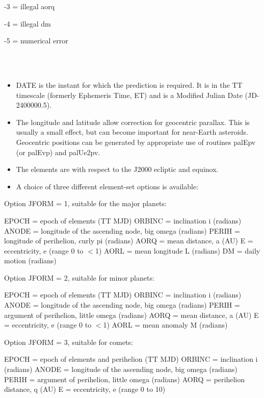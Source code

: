 \documentclass[twoside,11pt]{article}
\renewcommand{\_}{\texttt{\symbol{95}}}
\newcommand{\sstnotes}[1]{\goodbreak \item[Notes:] \mbox{} \\[1.3ex] #1}
\newcommand{\sstitemlist}[1]{
  \mbox{} \\
  \vspace{-3.5ex}
  \begin{itemize}
     #1
  \end{itemize}
}
\newcommand{\sstitem}{\item}
\newcommand{\sstnotes}[1]{\item[Notes:] #1 }
\newcommand{\sstitemlist}[1]{
      \begin{itemize}
         #1
      \end{itemize}
      \\
   }
\newcommand{\sstitem}{\item}
\begin{document}
{{{{            \sstitem
                 -3 = illegal aorq

            \sstitem
                 -4 = illegal dm

            \sstitem
                 -5 = numerical error
         }
      }
   }
   \sstnotes{
      \sstitemlist{

         \sstitem
         DATE is the instant for which the prediction is required.  It is
           in the TT timescale (formerly Ephemeris Time, ET) and is a
           Modified Julian Date (JD-2400000.5).

         \sstitem
         The longitude and latitude allow correction for geocentric
           parallax.  This is usually a small effect, but can become
           important for near-Earth asteroids.  Geocentric positions can be
           generated by appropriate use of routines palEpv (or palEvp) and
           palUe2pv.

         \sstitem
         The elements are with respect to the J2000 ecliptic and equinox.

         \sstitem
         A choice of three different element-set options is available:

      }
        Option JFORM = 1, suitable for the major planets:

          EPOCH  = epoch of elements (TT MJD)
          ORBINC = inclination i (radians)
          ANODE  = longitude of the ascending node, big omega (radians)
          PERIH  = longitude of perihelion, curly pi (radians)
          AORQ   = mean distance, a (AU)
          E      = eccentricity, e (range 0 to $<$1)
          AORL   = mean longitude L (radians)
          DM     = daily motion (radians)

        Option JFORM = 2, suitable for minor planets:

          EPOCH  = epoch of elements (TT MJD)
          ORBINC = inclination i (radians)
          ANODE  = longitude of the ascending node, big omega (radians)
          PERIH  = argument of perihelion, little omega (radians)
          AORQ   = mean distance, a (AU)
          E      = eccentricity, e (range 0 to $<$1)
          AORL   = mean anomaly M (radians)

        Option JFORM = 3, suitable for comets:

          EPOCH  = epoch of elements and perihelion (TT MJD)
          ORBINC = inclination i (radians)
          ANODE  = longitude of the ascending node, big omega (radians)
          PERIH  = argument of perihelion, little omega (radians)
          AORQ   = perihelion distance, q (AU)
          E      = eccentricity, e (range 0 to 10)

}}
\end{document}
